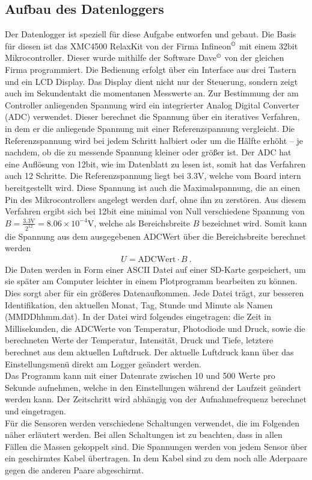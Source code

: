 \documentclass[12pt,a4paper,titlepage,headinclude,bibtotoc]{scrartcl}
\numberwithin{equation}{subsection}
\begin{document}
\subsection{Aufbau des Datenloggers}
Der Datenlogger ist speziell für diese Aufgabe entworfen und gebaut.
Die Basis für diesen ist das XMC4500 RelaxKit von der Firma Infineon$^\copyright$ mit einem 32bit Mikrocontroller.
Dieser wurde mithilfe der Software Dave$^\copyright$ von der gleichen Firma programmiert.
Die Bedienung erfolgt über ein Interface aus drei Tastern und ein LCD Display.
Das Display dient nicht nur der Steuerung, sondern zeigt auch im Sekundentakt die momentanen Messwerte an.
Zur Bestimmung der am Controller anliegenden Spannung wird ein integrierter Analog Digital Converter (ADC) verwendet.
Dieser berechnet die Spannung über ein iteratives Verfahren, in dem er die anliegende Spannung mit einer Referenzspannung vergleicht.
Die Referenzspannung wird bei jedem Schritt halbiert oder um die Hälfte erhöht -- je nachdem, ob die zu messende Spannung kleiner oder größer ist.
Der ADC hat eine Auflösung von 12bit, wie im Datenblatt \cite[7]{XMCRelaxkit} zu lesen ist, somit hat das Verfahren auch 12 Schritte.
Die Referenzspannung liegt bei 3.3\si{\volt}, welche vom Board intern bereitgestellt wird.
Diese Spannung ist auch die Maximalspannung, die an einen Pin des Mikrocontrollers angelegt werden darf, ohne ihn zu zerstören.
Aus diesem Verfahren ergibt sich bei 12bit eine minimal von Null verschiedene Spannung von $B=\frac{3.3\si{\volt}}{2^{12}}=8.06\times10^{-4}\si{\volt}$, welche als Bereichsbreite $B$ bezeichnet wird.
Somit kann die Spannung aus dem ausgegebenen ADCWert über die Bereichsbreite berechnet werden
\begin{align}
	U=\text{ADCWert}\cdot B~.\label{eq:ADCwert}
\end{align}
Die Daten werden in Form einer ASCII Datei auf einer SD-Karte gespeichert, um sie später am Computer leichter in einem Plotprogramm bearbeiten zu können.
Dies sorgt aber für ein größeres Datenaufkommen.
Jede Datei trägt, zur besseren Identifikation, den aktuellen Monat, Tag, Stunde und Minute als Namen (MMDDhhmm.dat).
In der Datei wird folgendes eingetragen: die Zeit in Millisekunden, die ADCWerte von Temperatur, Photodiode und Druck, sowie die berechneten Werte der Temperatur, Intensität, Druck und Tiefe, letztere berechnet aus dem aktuellen Luftdruck.
Der aktuelle Luftdruck kann über das Einstellungsmenü direkt am Logger geändert werden.\\
Das Programm kann mit einer Datenrate zwischen 10 und 500 Werte pro Sekunde aufnehmen, welche in den Einstellungen während der Laufzeit geändert werden kann.
Der Zeitschritt wird abhängig von der Aufnahmefrequenz berechnet und eingetragen.\\
Für die Sensoren werden verschiedene Schaltungen verwendet, die im Folgenden näher erläutert werden.
Bei allen Schaltungen ist zu beachten, dass in allen Fällen die Massen gekoppelt sind.
Die Spannungen werden von jedem Sensor über ein geschirmtes Kabel übertragen.
In dem Kabel sind zu dem noch alle Aderpaare gegen die anderen Paare abgeschirmt.
\end{document}
